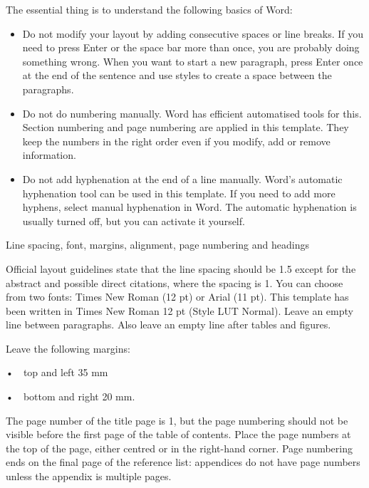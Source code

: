 \documentclass{article}
\begin{document}
\bigskip

The essential thing is to understand the following basics of Word:

\begin{itemize}
\item Do not modify your layout by adding consecutive spaces or line breaks. If you need to press Enter or the space bar
more than once, you are probably doing something wrong. When you want to start a new paragraph, press Enter once at the
end of the sentence and use styles to create a space between the paragraphs.
\item Do not do numbering manually. Word has efficient automatised tools for this. Section numbering and page numbering
are applied in this template. They keep the numbers in the right order even if you modify, add or remove information.
\item Do not add hyphenation at the end of a line manually. Word’s automatic hyphenation tool can be used in this
template. If you need to add more hyphens, select manual hyphenation in Word. The automatic hyphenation is usually
turned off, but you can activate it yourself.
\end{itemize}

\bigskip

Line spacing, font, margins, alignment, page numbering and headings 


\bigskip

Official layout guidelines state that the line spacing should be 1.5 except for the abstract and possible direct
citations, where the spacing is 1. You can choose from two fonts: Times New Roman (12 pt) or Arial (11 pt). This
template has been written in Times New Roman 12 pt (Style LUT Normal). Leave an empty line between paragraphs. Also
leave an empty line after tables and figures.


\bigskip

Leave the following margins:

•\ \ top and left 35 mm

•\ \ bottom and right 20 mm. 


\bigskip

The page number of the title page is 1, but the page numbering should not be visible before the first page of the table
of contents. Place the page numbers at the top of the page, either centred or in the right-hand corner. Page numbering
ends on the final page of the reference list: appendices do not have page numbers unless the appendix is multiple
pages. 
\end{document}
